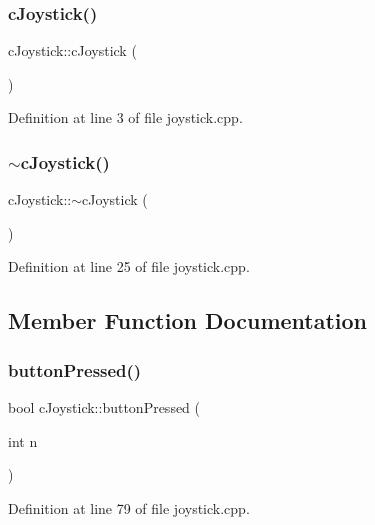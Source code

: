 \subsubsection{\texorpdfstring{c\+Joystick()}{cJoystick()}}
{\footnotesize\ttfamily c\+Joystick\+::c\+Joystick (\begin{DoxyParamCaption}{ }\end{DoxyParamCaption})}



Definition at line 3 of file joystick.\+cpp.

\mbox{\label{classc_joystick_a9e429f765dee1dc7dc3d31dc0f50ae0e}} 
\subsubsection{\texorpdfstring{$\sim$c\+Joystick()}{~cJoystick()}}
{\footnotesize\ttfamily c\+Joystick\+::$\sim$c\+Joystick (\begin{DoxyParamCaption}{ }\end{DoxyParamCaption})}



Definition at line 25 of file joystick.\+cpp.



\subsection{Member Function Documentation}
\mbox{\label{classc_joystick_a10375763b82c2da3e904d118d5cf2ecb}} 
\subsubsection{\texorpdfstring{button\+Pressed()}{buttonPressed()}}
{\footnotesize\ttfamily bool c\+Joystick\+::button\+Pressed (\begin{DoxyParamCaption}\item[{int}]{n }\end{DoxyParamCaption})}



Definition at line 79 of file joystick.\+cpp.

\mbox{\label{classc_joystick_a30d938005453ad77f512094c8a7a99f5}} 
